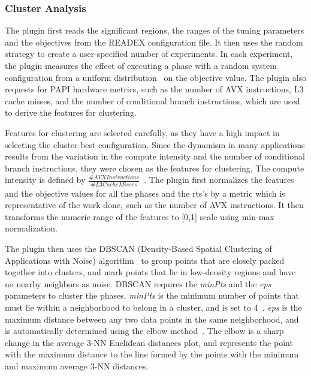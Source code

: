 \subsubsection{Cluster Analysis} \label{cluster-analysis} 

The plugin first reads the significant regions, the ranges of the tuning parameters and the objectives from the READEX configuration file. It then uses the random strategy to create a user-specified number of experiments. In each experiment, the plugin measures the effect of executing a phase with a random system configuration from a uniform distribution~\cite{AutoTune:Book2015} on the objective value. The plugin also requests for PAPI hardware metrics, such as the number of AVX instructions, L3 cache misses, and the number of conditional branch instructions, which are used to derive the features for clustering.

Features for clustering are selected carefully, as they have a high impact in selecting the cluster-best configuration. Since the dynamism in many applications results from the variation in the compute intensity and the number of conditional branch instructions, they were chosen as the features for clustering. The compute intensity is defined by $\frac{\#AVX Instructions}{\#L3 Cache Misses}$~\cite{PDPTA_18_Kumaraswamy}. The plugin first normalizes the features and the objective values for all the phases and the rts's by a metric which is representative of the work done, such as the number of AVX instructions. It then transforms the numeric range of the features to [0,1] scale using min-max normalization.

The plugin then uses the DBSCAN (Density-Based Spatial Clustering of Applications with Noise) algorithm~\cite{Ester-1996} to group points that are closely packed together into clusters, and mark points that lie in low-density regions and have no nearby neighbors as noise. DBSCAN requires the \textit{minPts} and the \textit{eps} parameters to cluster the phases. \textit{minPts} is the minimum number of points that must lie within a neighborhood to belong in a cluster, and is set to 4~\cite{Sander-1998}. \textit{eps} is the maximum distance between any two data points in the same neighborhood, and is automatically determined using the elbow method~\cite{gaonkar2013autoepsdbscan}. The elbow is a sharp change in the average 3-NN Euclidean distances plot, and represents the point with the maximum distance to the line formed by the points with the minimum and maximum average 3-NN distances.

